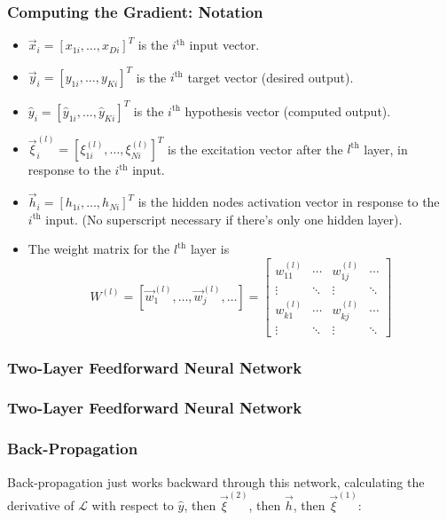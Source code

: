 \documentclass{beamer}
\begin{document}
\begin{frame}
  \frametitle{Computing the Gradient: Notation}
  \begin{itemize}
  \item $\vec{x}_i=[x_{1i},\ldots,x_{Di}]^T$ is the $i^{\textrm{th}}$ input vector.
  \item $\vec{y}_i=[y_{1i},\ldots,y_{Ki}]^T$ is the $i^{\textrm{th}}$ target vector (desired output).
  \item $\hat{y}_i=[\hat{y}_{1i},\ldots,\hat{y}_{Ki}]^T$ is the
    $i^{\textrm{th}}$ hypothesis vector (computed output).
  \item $\vec\xi_i^{(l)}=[\xi_{1i}^{(l)},\ldots,\xi_{Ni}^{(l)}]^T$ is the
    excitation vector after the $l^{\textrm{th}}$ layer, in response
    to the $i^{\textrm{th}}$ input.
  \item $\vec{h}_i=[h_{1i},\ldots,h_{Ni}]^T$ is the hidden nodes
    activation vector in response to the $i^{\textrm{th}}$ input. (No
     superscript necessary if there's only one hidden layer).
  \item The weight matrix for the $l^{\textrm{th}}$ layer is
    \[
    W^{(l)}=\left[\vec{w}_1^{(l)},\ldots,\vec{w}_j^{(l)},\ldots\right]=
    \left[\begin{array}{cccc}
        w_{11}^{(l)}&\cdots&w_{1j}^{(l)}&\cdots\\
        \vdots &\ddots&\vdots&\ddots\\
        w_{k1}^{(l)}&\cdots&w_{kj}^{(l)}&\cdots\\
        \vdots &\ddots&\vdots&\ddots
      \end{array}\right]
    \]
  \end{itemize}
\end{frame}
      
\begin{frame}
  \frametitle{Two-Layer Feedforward Neural Network}
  \begin{small}\end{small}
\end{frame}

\begin{frame}
  \frametitle{Two-Layer Feedforward Neural Network}
  \begin{small}\end{small}
\end{frame}

\begin{frame}
  \frametitle{Back-Propagation}

  Back-propagation just works backward through this network, calculating
  the derivative of ${\mathcal L}$ with respect to $\hat{y}$, then $\vec\xi^{(2)}$, then
  $\vec{h}$, then $\vec\xi^{(1)}$:
  \begin{small}\end{small}
\end{frame}
\end{document}
